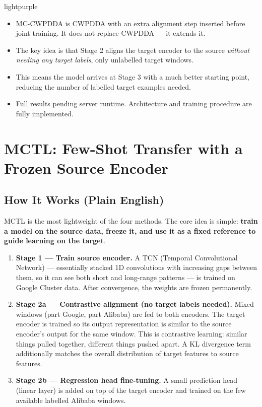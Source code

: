 \documentclass[12pt,a4paper]{article}
\begin{document}
\begin{keybox}{lightpurple}
\begin{itemize}[leftmargin=*,noitemsep]
  \item MC-CWPDDA is CWPDDA with an extra alignment step inserted before
        joint training. It does not replace CWPDDA --- it extends it.
  \item The key idea is that Stage 2 aligns the target encoder to the source
        \emph{without needing any target labels}, only unlabelled target windows.
  \item This means the model arrives at Stage 3 with a much better starting
        point, reducing the number of labelled target examples needed.
  \item Full results pending server runtime. Architecture and training
        procedure are fully implemented.
\end{itemize}
\end{keybox}

\section{\textcolor{mctlcolor}{MCTL}: Few-Shot Transfer with a Frozen Source Encoder}
\label{sec:mctl}

\subsection{How It Works (Plain English)}

MCTL is the most lightweight of the four methods. The core idea is simple:
\textbf{train a model on the source data, freeze it, and use it as a fixed
reference to guide learning on the target}.

\begin{enumerate}[leftmargin=*]
  \item \textbf{Stage 1 --- Train source encoder.}
        A TCN (Temporal Convolutional Network) --- essentially stacked 1D
        convolutions with increasing gaps between them, so it can see both
        short and long-range patterns --- is trained on Google Cluster data.
        After convergence, the weights are frozen permanently.
  \item \textbf{Stage 2a --- Contrastive alignment (no target labels needed).}
        Mixed windows (part Google, part Alibaba) are fed to both encoders.
        The target encoder is trained so its output representation is similar
        to the source encoder's output for the same window. This is contrastive
        learning: similar things pulled together, different things pushed apart.
        A KL divergence term additionally matches the overall distribution of
        target features to source features.
  \item \textbf{Stage 2b --- Regression head fine-tuning.}
        A small prediction head (linear layer) is added on top of the target
        encoder and trained on the few available labelled Alibaba windows.
\end{enumerate}
\end{document}
